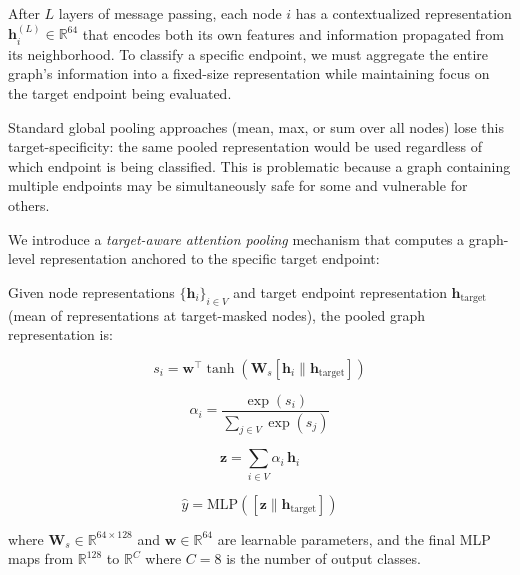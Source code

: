 After $L$ layers of message passing, each node $i$ has a contextualized representation $\mathbf{h}_i^{(L)} \in \mathbb{R}^{64}$ that encodes both its own features and information propagated from its neighborhood. To classify a specific endpoint, we must aggregate the entire graph's information into a fixed-size representation while maintaining focus on the target endpoint being evaluated.

Standard global pooling approaches (mean, max, or sum over all nodes) lose this target-specificity: the same pooled representation would be used regardless of which endpoint is being classified. This is problematic because a graph containing multiple endpoints may be simultaneously safe for some and vulnerable for others.

We introduce a \emph{target-aware attention pooling} mechanism that computes a graph-level representation anchored to the specific target endpoint:

\begin{definition}
Given node representations $\{\mathbf{h}_i\}_{i \in V}$ and target endpoint representation $\mathbf{h}_{\text{target}}$ (mean of representations at target-masked nodes), the pooled graph representation is:
\end{definition}

\begin{equation}
\label{eq:attn-score}
s_i = \mathbf{w}^{\top} \tanh\left(\mathbf{W}_s \left[\mathbf{h}_i \| \mathbf{h}_{\text{target}}\right]\right)
\end{equation}

\begin{equation}
\label{eq:attn-weight}
\alpha_i = \frac{\exp(s_i)}{\sum_{j \in V} \exp(s_j)}
\end{equation}

\begin{equation}
\label{eq:pooled}
\mathbf{z} = \sum_{i \in V} \alpha_i \, \mathbf{h}_i
\end{equation}

\begin{equation}
\label{eq:classification}
\hat{y} = \text{MLP}\left(\left[\mathbf{z} \| \mathbf{h}_{\text{target}}\right]\right)
\end{equation}

where $\mathbf{W}_s \in \mathbb{R}^{64 \times 128}$ and $\mathbf{w} \in \mathbb{R}^{64}$ are learnable parameters, and the final MLP maps from $\mathbb{R}^{128}$ to $\mathbb{R}^{C}$ where $C = 8$ is the number of output classes.

